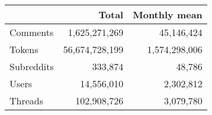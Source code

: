   \begin{tabular}{l r r}
    \toprule
    & Total & Monthly mean \\
    \midrule
    Comments   & 1,625,271,269 & 45,146,424 \\
    Tokens     & 56,674,728,199 & 1,574,298,006 \\
    Subreddits & 333,874 & 48,786 \\
    Users      & 14,556,010     & 2,302,812 \\
    Threads      & 102,908,726     & 3,079,780 \\
    \bottomrule
    \end{tabular}